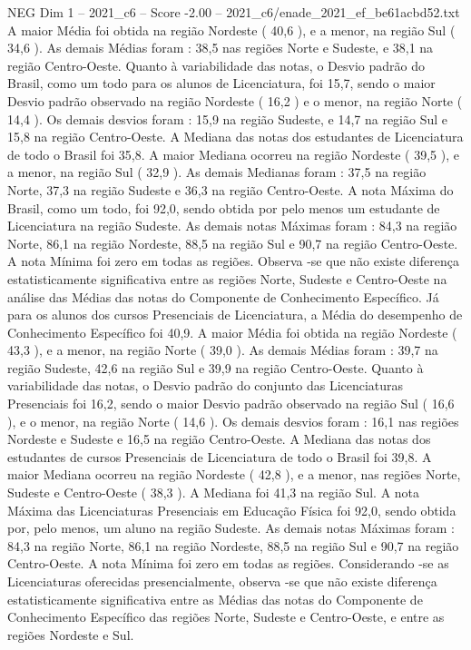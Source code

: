 \begin{textsample}{NEG Dim 1 – 2021\_c6 – Score -2.00 – 2021\_c6/enade\_2021\_ef\_be61acbd52.txt}
A maior Média foi obtida na região Nordeste ( 40,6 ), e a menor, na região Sul ( 34,6 ).
As demais Médias foram : 38,5 nas regiões Norte e Sudeste, e 38,1 na região Centro-Oeste.
Quanto à variabilidade das notas, o Desvio padrão do Brasil, como um todo para os alunos de Licenciatura, foi 15,7, sendo o maior Desvio padrão observado na região Nordeste ( 16,2 ) e o menor, na região Norte ( 14,4 ).
Os demais desvios foram : 15,9 na região Sudeste, e 14,7 na região Sul e 15,8 na região Centro-Oeste.
A Mediana das notas dos estudantes de Licenciatura de todo o Brasil foi 35,8.
A maior Mediana ocorreu na região Nordeste ( 39,5 ), e a menor, na região Sul ( 32,9 ).
As demais Medianas foram : 37,5 na região Norte, 37,3 na região Sudeste e 36,3 na região Centro-Oeste.
A nota Máxima do Brasil, como um todo, foi 92,0, sendo obtida por pelo menos um estudante de Licenciatura na região Sudeste.
As demais notas Máximas foram : 84,3 na região Norte, 86,1 na região Nordeste, 88,5 na região Sul e 90,7 na região Centro-Oeste.
A nota Mínima foi zero em todas as regiões.
Observa -se que não existe diferença estatisticamente significativa entre as regiões Norte, Sudeste e Centro-Oeste na análise das Médias das notas do Componente de Conhecimento Específico.
Já para os alunos dos cursos Presenciais de Licenciatura, a Média do desempenho de Conhecimento Específico foi 40,9.
A maior Média foi obtida na região Nordeste ( 43,3 ), e a menor, na região Norte ( 39,0 ).
As demais Médias foram : 39,7 na região Sudeste, 42,6 na região Sul e 39,9 na região Centro-Oeste.
Quanto à variabilidade das notas, o Desvio padrão do conjunto das Licenciaturas Presenciais foi 16,2, sendo o maior Desvio padrão observado na região Sul ( 16,6 ), e o menor, na região Norte ( 14,6 ).
Os demais desvios foram : 16,1 nas regiões Nordeste e Sudeste e 16,5 na região Centro-Oeste.
A Mediana das notas dos estudantes de cursos Presenciais de Licenciatura de todo o Brasil foi 39,8.
A maior Mediana ocorreu na região Nordeste ( 42,8 ), e a menor, nas regiões Norte, Sudeste e Centro-Oeste ( 38,3 ).
A Mediana foi 41,3 na região Sul.
A nota Máxima das Licenciaturas Presenciais em Educação Física foi 92,0, sendo obtida por, pelo menos, um aluno na região Sudeste.
As demais notas Máximas foram : 84,3 na região Norte, 86,1 na região Nordeste, 88,5 na região Sul e 90,7 na região Centro-Oeste.
A nota Mínima foi zero em todas as regiões.
Considerando -se as Licenciaturas oferecidas presencialmente, observa -se que não existe diferença estatisticamente significativa entre as Médias das notas do Componente de Conhecimento Específico das regiões Norte, Sudeste e Centro-Oeste, e entre as regiões Nordeste e Sul.

\end{textsample}
